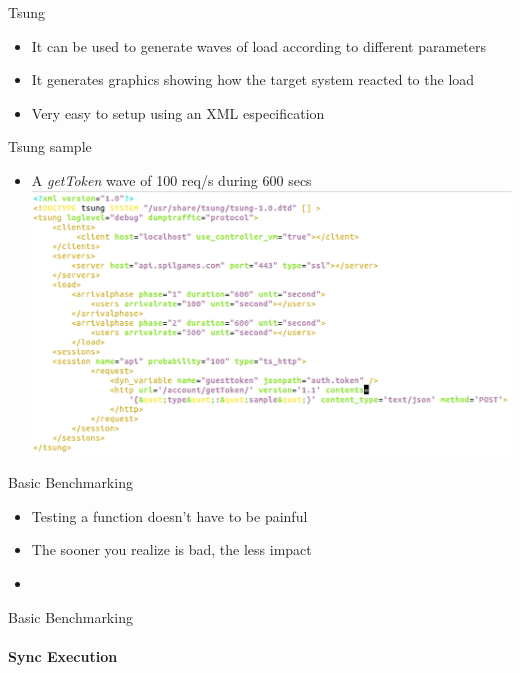 \documentclass[]{beamer}
\begin{document}
\begin{frame}{Tsung}
    \begin{itemize}
    \pause
    \item It can be used to generate waves of load according to different parameters
    \pause
    \item It generates graphics showing how the target system reacted to the load
    \pause
    \item Very easy to setup using an XML especification
    \end{itemize}
\end{frame}

\begin{frame}{Tsung sample}
    \begin{itemize}
    \item A \emph{getToken} wave of 100 req/s during 600 secs
    \includegraphics[scale=0.40]{images/tsung_spec.eps}
    \end{itemize}
\end{frame}

\begin{frame}{Basic Benchmarking}
    \begin{itemize}
    \item Testing a function doesn't have to be painful
    \pause
    \item The sooner you realize is bad, the less impact
    \pause
    \item 
    \end{itemize}
\end{frame}

\begin{frame}{Basic Benchmarking}
    \framesubtitle{Sync Execution}
    
\end{frame}
\end{document}

